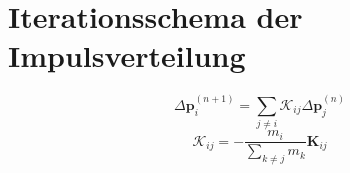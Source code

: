 \section{Iterationsschema der Impulsverteilung}
\[
\Delta\mathbf{p}_i^{(n+1)} = \sum_{j \neq i} \mathcal{K}_{ij} \Delta\mathbf{p}_j^{(n)}
\]
\[
\mathcal{K}_{ij} = -\frac{m_i}{\sum_{k \neq j} m_k} \mathbf{K}_{ij}
\]